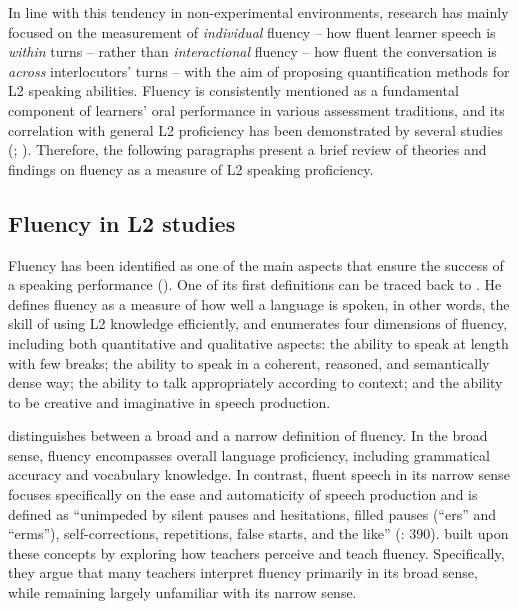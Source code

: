 In line with this tendency in non-experimental environments, research has mainly focused on the measurement of \textit{individual} fluency – how fluent learner speech is \textit{within} turns – rather than \textit{interactional} fluency – how fluent the conversation is \textit{across} interlocutors’ turns – \citep{Peltonen2017} with the aim of proposing quantification methods for L2 speaking abilities. Fluency is consistently mentioned as a fundamental component of learners’ oral performance in various assessment traditions, and its correlation with general L2 proficiency has been demonstrated by several studies (\citealt{DeJongEtAl2013,DeJongEtAl2015}; \citealt{SegalowitzFreed2004}). Therefore, the following paragraphs present a brief review of theories and findings on fluency as a measure of L2 speaking proficiency.

\subsection{Fluency in L2 studies}
\label{sec:3.1.2}
Fluency has been identified as one of the main aspects that ensure the success of a speaking performance (\citealt{DeJong2016}). One of its first definitions can be traced back to \citet{Fillmore1979}. He defines fluency as a measure of how well a language is spoken, in other words, the skill of using L2 knowledge efficiently, and enumerates four dimensions of fluency, including both quantitative and qualitative aspects: the ability to speak at length with few breaks; the ability to speak in a coherent, reasoned, and semantically dense way; the ability to talk appropriately according to context; and the ability to be creative and imaginative in speech production.

\citet{Lennon1990} distinguishes between a broad and a narrow definition of fluency. In the broad sense, fluency encompasses overall language proficiency, including grammatical accuracy and vocabulary knowledge. In contrast, fluent speech in its narrow sense focuses specifically on the ease and automaticity of speech production and is defined as “unimpeded by silent pauses and hesitations, filled pauses (“ers” and “erms”), self-corrections, repetitions, false starts, and the like” (\citealt{Lennon1990}: 390). \citet{TavakoliHunter2018}  built upon these concepts by exploring how teachers perceive and teach fluency. Specifically, they argue that many teachers interpret fluency primarily in its broad sense, while remaining largely unfamiliar with its narrow sense.


